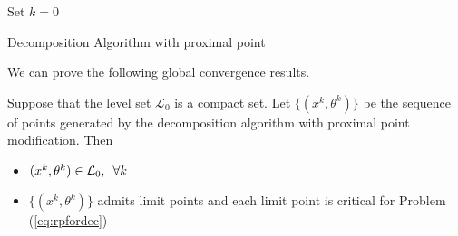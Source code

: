 \begin{algorithm}[ht]
 Set $k = 0$\\
 \caption{Decomposition Algorithm with proximal point}
 \label{alg:proximal}
\end{algorithm}
We can prove the following global convergence results.
\begin{proposition}
Suppose that the level set $\mathcal{L}_0$ is a compact set. Let $\{(x^k, \theta^k)\}$ be the sequence of points generated by the decomposition algorithm with proximal point modification. Then
\begin{itemize}
\item $(x^k, \theta^k) \in \mathcal{L}_0, \enskip \forall k$ 
\item  $\{(x^k, \theta^k)\}$ admits limit points and each limit point is critical for Problem (\ref{eq:rpfordec})
\end{itemize}
\end{proposition}
